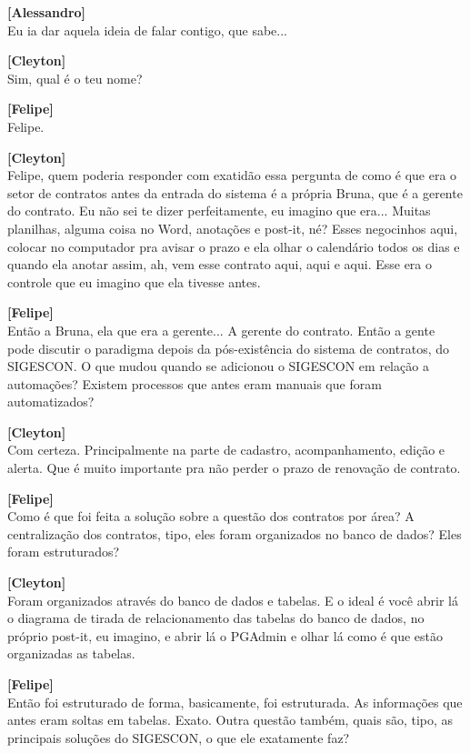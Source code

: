 \documentclass[12pt,a4paper]{article}
\begin{document}
\begin{entrevista}
    \textbf{[Alessandro]} \\
    Eu ia dar aquela ideia de falar contigo, que sabe...

    \textbf{[Cleyton]} \\
    Sim, qual é o teu nome?

    \textbf{[Felipe]} \\
    Felipe.

    \textbf{[Cleyton]} \\
    Felipe, quem poderia responder com exatidão essa pergunta de como é que era o setor de contratos antes da entrada do sistema é a própria Bruna, que é a gerente do contrato. Eu não sei te dizer perfeitamente, eu imagino que era... Muitas planilhas, alguma coisa no Word, anotações e post-it, né? Esses negocinhos aqui, colocar no computador pra avisar o prazo e ela olhar o calendário todos os dias e quando ela anotar assim, ah, vem esse contrato aqui, aqui e aqui. Esse era o controle que eu imagino que ela tivesse antes.

    \textbf{[Felipe]} \\
    Então a Bruna, ela que era a gerente... A gerente do contrato. Então a gente pode discutir o paradigma depois da pós-existência do sistema de contratos, do SIGESCON. O que mudou quando se adicionou o SIGESCON em relação a automações? Existem processos que antes eram manuais que foram automatizados?

    \textbf{[Cleyton]} \\
    Com certeza. Principalmente na parte de cadastro, acompanhamento, edição e alerta. Que é muito importante pra não perder o prazo de renovação de contrato.

    \textbf{[Felipe]} \\
    Como é que foi feita a solução sobre a questão dos contratos por área? A centralização dos contratos, tipo, eles foram organizados no banco de dados? Eles foram estruturados?

    \textbf{[Cleyton]} \\
    Foram organizados através do banco de dados e tabelas. E o ideal é você abrir lá o diagrama de tirada de relacionamento das tabelas do banco de dados, no próprio post-it, eu imagino, e abrir lá o PGAdmin e olhar lá como é que estão organizadas as tabelas.

    \textbf{[Felipe]} \\
    Então foi estruturado de forma, basicamente, foi estruturada. As informações que antes eram soltas em tabelas. Exato. Outra questão também, quais são, tipo, as principais soluções do SIGESCON, o que ele exatamente faz?


\end{entrevista}
\end{document}
